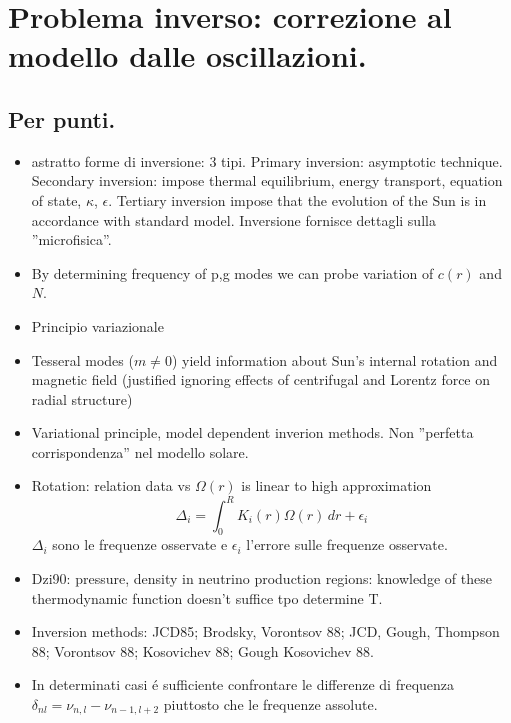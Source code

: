 \documentclass[../main.tex]{subfiles}
\begin{document}
\chapter{Problema inverso: correzione al modello dalle oscillazioni.}
\PartialToc

\section{Per punti.}

\begin{itemize}
    
    \item astratto forme di inversione: 3 tipi. Primary inversion: asymptotic technique. Secondary inversion: impose thermal equilibrium, energy transport, equation of state, $\kappa$, $\epsilon$. Tertiary inversion impose that the evolution of the Sun is in accordance with standard model. Inversione fornisce dettagli sulla ''microfisica''.
    
    \item By determining frequency of p,g modes we can probe variation of $c(r)$ and $N$.
    \item Principio variazionale
    \item Tesseral modes ($m\neq0$) yield information about Sun's internal rotation and magnetic field (justified ignoring effects of centrifugal and Lorentz force on radial structure)
    \item Variational principle, model dependent inverion methods. Non ''perfetta corrispondenza'' nel modello solare.
    
    \item Rotation: relation data vs $\Omega(r)$ is linear to high approximation
    \begin{equation*}
    \Delta_i=\int_0^RK_i(r)\Omega(r)\,dr+\epsilon_i
    \end{equation*}
    $\Delta_i$ sono le frequenze osservate e $\epsilon_i$ l'errore sulle frequenze osservate.
    
    \item Dzi90: pressure, density in neutrino production regions: knowledge of these thermodynamic function doesn't suffice tpo determine T.
    
    \item Inversion methods: JCD85; Brodsky, Vorontsov 88; JCD, Gough, Thompson 88;  Vorontsov 88; Kosovichev 88; Gough Kosovichev 88.
    
    \item In determinati casi \'e sufficiente confrontare le differenze di frequenza $\delta_{nl}=\nu_{n,l}-\nu_{n-1,l+2}$ piuttosto che le frequenze assolute.
    

\end{itemize}
\end{document}
